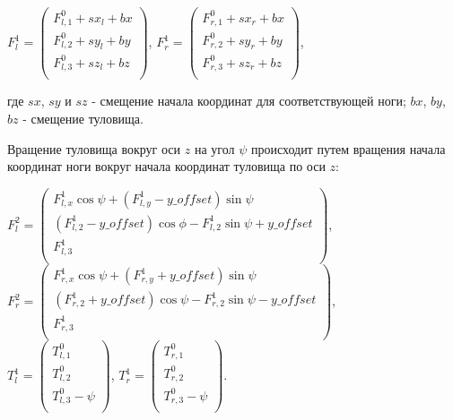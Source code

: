 \begin{center}
$F^{1}_{l} = \begin{pmatrix}
F^{0}_{l,1} + sx_l + bx \\
F^{0}_{l,2} + sy_l + by \\
F^{0}_{l,3} + sz_l + bz \\
\end{pmatrix}$, $F^{1}_{r} = \begin{pmatrix}
F^{0}_{r,1} + sx_r + bx \\
F^{0}_{r,2} + sy_r + by \\
F^{0}_{r,3} + sz_r + bz \\
\end{pmatrix}$,
\end{center}

\noindent где $sx$, $sy$ и $sz$ - смещение начала координат для соответствующей ноги; $bx$, $by$, $bz$ - смещение туловища.

Вращение туловища вокруг оси $z$ на угол $\psi$ происходит путем вращения начала координат ноги вокруг начала координат туловища по оси $z$:

\begin{center}
$F^{2}_{l} = \begin{pmatrix}
F^{1}_{l,x} \cos \psi +( F^{1}_{l,y} - y\_offset) \sin \psi \\
(F^{1}_{l,2} - y\_offset) \cos \phi - F^{1}_{l,2} \sin \psi + y\_offset \\
F^{1}_{l,3} \\
\end{pmatrix}$, $F^{2}_{r} = \begin{pmatrix}
F^{1}_{r,x} \cos \psi +( F^{1}_{r,y} + y\_offset) \sin \psi \\
(F^{1}_{r,2} + y\_offset) \cos \psi - F^{1}_{r,2} \sin \psi - y\_offset \\
F^{1}_{r,3} \\
\end{pmatrix}$,\\
$T^{1}_{l} = \begin{pmatrix}
T^{0}_{l,1} \\
T^{0}_{l,2} \\
T^{0}_{l,3} - \psi \\
\end{pmatrix}$,
$T^{1}_{r} = \begin{pmatrix}
T^{0}_{r,1} \\
T^{0}_{r,2} \\
T^{0}_{r,3} - \psi \\
\end{pmatrix}$.
\end{center}

